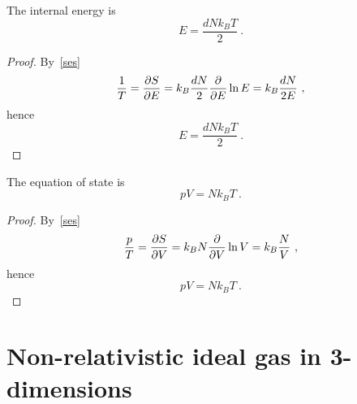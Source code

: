     The internal energy is 
    \begin{equation*}
        E = \frac{d N k_B T}{2} ~.
    \end{equation*}
    \begin{proof}
        By~\eqref{ses}
        \begin{equation*}
            \frac{1}{T} = \frac{\partial S}{\partial E} = k_B \frac{dN}{2} \frac{\partial}{\partial E} \ln E = k_B \frac{dN}{2E} ~,
        \end{equation*}
        hence 
        \begin{equation*}
            E = \frac{d N k_B T}{2} ~.
        \end{equation*}
    \end{proof}

    The equation of state is  
    \begin{equation*}
        p V = N k_B T ~.
    \end{equation*}
    \begin{proof}
        By~\eqref{ses}
        \begin{equation*}
            \frac{p}{T} = \frac{\partial S}{\partial V} = k_B N \frac{\partial}{\partial V} \ln V = k_B \frac{N}{V}  ~,
        \end{equation*}
        hence 
        \begin{equation*}
            pV = N k_B T ~.
        \end{equation*}
    \end{proof}

\section{Non-relativistic ideal gas in 3-dimensions}

